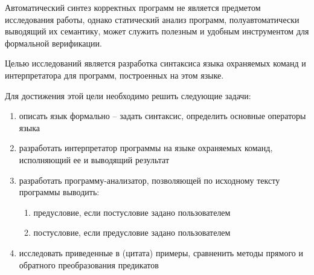 Автоматический синтез корректных программ не является предметом исследования работы, 
однако статический анализ программ, полуавтоматически выводящий их семантику,
может служить полезным и удобным инструментом для формальной верификации. 

Целью исследований является разработка синтаксиса языка охраняемых команд и интерпретатора для программ, построенных на этом языке.

Для достижения этой цели необходимо решить следующие задачи:
\begin{enumerate}
	\item описать язык формально -- задать синтаксис, определить основные операторы языка
	\item разработать интерпретатор программы на языке охраняемых команд, исполняющий ее и выводящий результат
	\item разработать программу-анализатор, позволяющей по исходному тексту программы выводить:
		\begin{enumerate}
			\item предусловие, если постусловие задано пользователем
			\item постусловие, если предусловие задано пользователем
		\end{enumerate}		
	\item исследовать приведенные в (цитата) примеры, сравненить методы прямого и обратного преобразования предикатов
\end{enumerate} 


